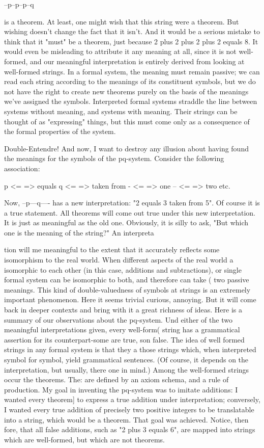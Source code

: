 --p--p--p--q 

is a theorem. At least, one might wish that this string were a theorem. But wishing doesn't change the fact that it isn't. And it would be a serious mistake to think that it "must" be a theorem, just because 2 plus 2 plus 2 plus 2 equals 8. It would even be misleading to attribute it any meaning at all, since it is not well-formed, and our meaningful interpretation is entirely derived from looking at well-formed strings. In a formal system, the meaning must remain passive; we can read each string according to the meanings of its constituent symbols, but we do not have the right to create new theorems purely on the basis of the meanings we've assigned the symbols. Interpreted formal systems straddle the line between systems without meaning, and systems with meaning. Their strings can be thought of as "expressing" things, but this must come only as a consequence of the formal properties of the system. 

Double-Entendre! And now, I want to destroy any illusion about having found the meanings for the symbols of the pq-system. Consider the following association: 

p <= => equals q <= => taken from - <= => one -- <= => two etc. 

Now, --p---q---- has a new interpretation: "2 equals 3 taken from 5". Of course it is a true statement. All theorems will come out true under this new interpretation. It is just as meaningful as the old one. Obviously, it is silly to ask, "But which one is the meaning of the string?" An interpreta 







tion will me meaningful to the extent that it accurately reflects some isomorphism to the real world. When different aspects of the real world a isomorphic to each other (in this case, additions and subtractions), or single formal system can be isomorphic to both, and therefore can take ( two passive meanings. This kind of double-valuedness of symbols at strings is an extremely important phenomenon. Here it seems trivial curious, annoying. But it will come back in deeper contexts and bring with it a great richness of ideas. Here is a summary of our observations about the pq-system. Und either of the two meaningful interpretations given, every well-form( string has a grammatical assertion for its counterpart-some are true, son false. The idea of well formed strings in any formal system is that they a those strings which, when interpreted symbol for symbol, yield grammatical sentences. (Of course, it depends on the interpretation, but usually, there one in mind.) Among the well-formed strings occur the theorems. The: are defined by an axiom schema, and a rule of production. My goal in inventing the pq-system was to imitate additions: I wanted every theorem] to express a true addition under interpretation; conversely, I wanted every true addition of precisely two positive integers to be translatable into a string, which would be a theorem. That goal was achieved. Notice, then fore, that all false additions, such as "2 plus 3 equals 6", are mapped into strings which are well-formed, but which are not theorems. 



